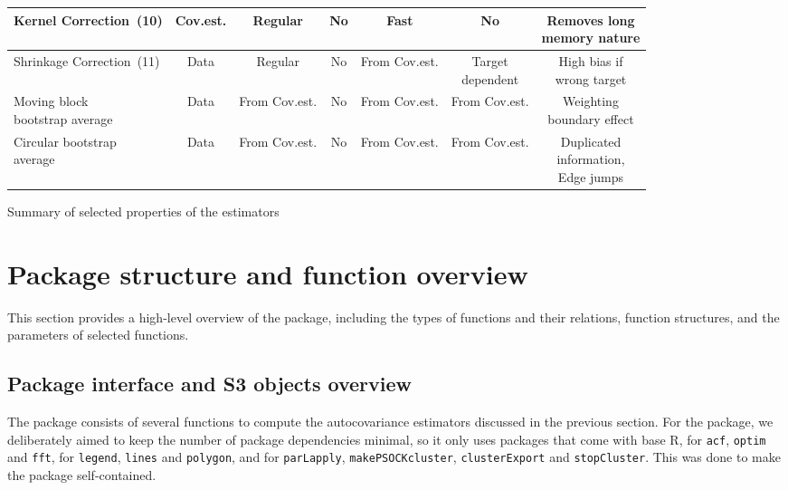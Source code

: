 {\begin{widetable}[hbt!]
{\begin{tabular}{l c c c c c c}
        Kernel Correction~(10) & Cov.est. & Regular & No & Fast & No & \makecell{Removes long\\ memory nature}  \\ \midrule

        Shrinkage Correction~(11) & Data  & Regular & No & From Cov.est. & \makecell{Target\\ dependent} & \makecell{High bias if\\ wrong target} \\ \midrule

        \makecell[l]{Moving block\\ bootstrap average} & Data  & From Cov.est. & No & From Cov.est. & From Cov.est. & \makecell{Weighting\\  boundary effect} \\ \midrule

        \makecell[l]{Circular bootstrap\\ average} & Data & From Cov.est. & No & From Cov.est. & From Cov.est. & \makecell{Duplicated\\ information, \\ Edge jumps} \\ \bottomrule
    \end{tabular}}
    \caption{Summary of selected properties of the estimators}
    \label{tab:tab_summary}
\end{widetable}
}

\section{Package structure and function overview} \label{sec:overview}

This section provides a high-level overview of the package, including the types of functions and their relations, function structures, and the parameters of selected functions.

\subsection{Package interface and S3 objects overview}

The package  consists of several functions to compute the autocovariance estimators discussed in the previous section.
For the  package, we deliberately aimed to keep the number of package dependencies minimal, so it only uses packages that come with base R,  for \texttt{acf}, \texttt{optim} and \texttt{fft},  for \texttt{legend}, \texttt{lines} and \texttt{polygon}, and  for \texttt{parLapply}, \texttt{makePSOCKcluster}, \texttt{clusterExport} and \texttt{stopCluster}. This was done to make the package self-contained.

